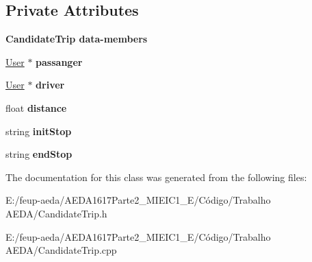 \subsection*{Private Attributes}
\begin{Indent}\textbf{ Candidate\+Trip data-\/members}\par
\begin{DoxyCompactItemize}
\item 
\hyperlink{class_user}{User} $\ast$ {\bfseries passanger}
\item 
\hyperlink{class_user}{User} $\ast$ {\bfseries driver}
\item 
float {\bfseries distance}
\item 
string {\bfseries init\+Stop}
\item 
string {\bfseries end\+Stop}
\end{DoxyCompactItemize}
\end{Indent}


The documentation for this class was generated from the following files\+:\begin{DoxyCompactItemize}
\item 
E\+:/feup-\/aeda/\+A\+E\+D\+A1617\+Parte2\+\_\+M\+I\+E\+I\+C1\+\_\+\+E/\+Código/\+Trabalho A\+E\+D\+A/Candidate\+Trip.\+h\item 
E\+:/feup-\/aeda/\+A\+E\+D\+A1617\+Parte2\+\_\+M\+I\+E\+I\+C1\+\_\+\+E/\+Código/\+Trabalho A\+E\+D\+A/Candidate\+Trip.\+cpp\end{DoxyCompactItemize}
